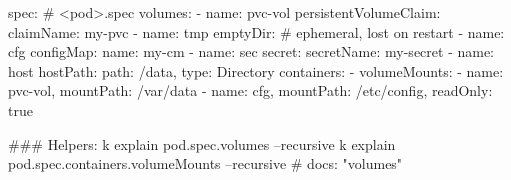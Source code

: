 \begin{cheatcodebash}
spec:                  # <pod>.spec
  volumes:
  - name: pvc-vol
    persistentVolumeClaim:
      claimName: my-pvc
  - name: tmp
    emptyDir: {}           # ephemeral, lost on restart
  - name: cfg
    configMap: {name: my-cm}
  - name: sec
    secret: {secretName: my-secret}
  - name: host
    hostPath: {path: /data, type: Directory}
  containers:
  - volumeMounts:
    - {name: pvc-vol, mountPath: /var/data}
    - {name: cfg, mountPath: /etc/config, readOnly: true}
\end{cheatcodebash}

\begin{cheatcodebash}
### Helpers:
k explain pod.spec.volumes --recursive
k explain pod.spec.containers.volumeMounts --recursive
# docs: "volumes"
\end{cheatcodebash}